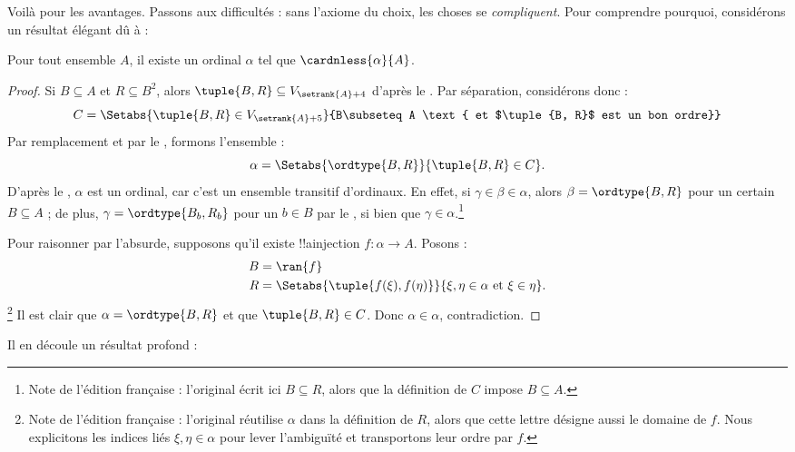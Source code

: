 \documentclass[../../../include/open-logic-section]{subfiles}
\begin{document}

Voilà pour les avantages. Passons aux difficultés :
sans l'axiome du choix, les choses se
\emph{compliquent}. Pour comprendre pourquoi,
considérons un résultat élégant dû à
\cite{Hartogs1915} :

\begin{lem}
Pour tout ensemble $A$, il existe un ordinal
$\alpha$ tel que $\cardnless{\alpha}{A}$.
\end{lem}

\begin{proof}
Si $B \subseteq A$ et $R \subseteq B^2$,
alors $\tuple{B, R} \subseteq
V_{\setrank{A}+4}$ d'après le
.
Par séparation, considérons donc :
\[
	C = \Setabs{\tuple{B, R} \in V_{\setrank{A}+5}}
	{B\subseteq A
	\text{ et $\tuple{B, R}$ est un bon ordre}}
\]
Par remplacement et par le
,
formons l'ensemble :
\[
	\alpha =
	\Setabs{\ordtype{B, R}}{\tuple{B, R} \in C}.
\]
D'après
le ,
$\alpha$ est un ordinal, car c'est un
ensemble transitif d'ordinaux. En effet,
si $\gamma \in \beta \in \alpha$, alors
$\beta = \ordtype{B, R}$ pour un certain
$B \subseteq A$ ; de plus,
$\gamma = \ordtype{B_b, R_b}$ pour un
$b \in B$ par le
,
si bien que $\gamma \in \alpha$.\footnote{
Note de l'édition française : l'original
écrit ici $B\subseteq R$, alors que
la définition de $C$ impose $B\subseteq A$.}

Pour raisonner par l'absurde, supposons
qu'il existe !!a{injection}
$f \colon \alpha \to A$. Posons :
\begin{align*}
	B &= \ran{f}\\
	R &= \Setabs{\tuple{f(\xi), f(\eta)}}
	{\xi,\eta\in\alpha \text{ et } \xi \in \eta}.
\end{align*}
\footnote{Note de l'édition française :
l'original réutilise $\alpha$ dans la
définition de $R$, alors que cette lettre
désigne aussi le domaine de $f$.
Nous explicitons les indices liés
$\xi,\eta\in\alpha$ pour lever l'ambiguïté
et transportons leur ordre par $f$.}
Il est clair que
$\alpha = \ordtype{B, R}$ et que
$\tuple{B, R} \in C$. Donc
$\alpha \in \alpha$, contradiction.
\end{proof}

Il en découle un résultat profond :
\end{document}
